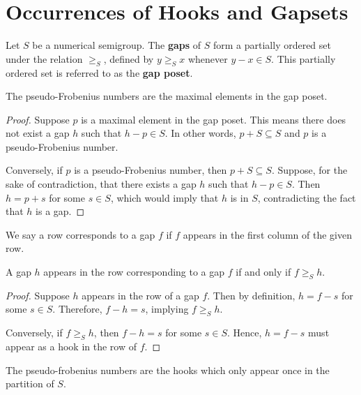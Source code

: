 \section{Occurrences of Hooks and Gapsets}

\begin{definition}
Let \( S \) be a numerical semigroup. The \textbf{gaps} of \( S \) form a partially ordered set under the relation \( \ge_S \), defined by \( y \ge_S x \) whenever \( y - x \in S \). This partially ordered set is referred to as the \textbf{gap poset}.
\end{definition}

\begin{proposition}
    The pseudo-Frobenius numbers are the maximal elements in the gap poset.
\end{proposition}

\begin{proof}
    Suppose \( p \) is a maximal element in the gap poset. This means there does not exist a gap \( h \) such that \( h - p \in S \). In other words, \( p + S \subseteq S \) and \( p \) is a pseudo-Frobenius number.

    Conversely, if \( p \) is a pseudo-Frobenius number, then \( p + S \subseteq S \). Suppose, for the sake of contradiction, that there exists a gap \( h \) such that \( h - p \in S \). Then \( h = p + s \) for some \( s \in S \), which would imply that \( h \) is in \( S \), contradicting the fact that \( h \) is a gap.
\end{proof}

We say a row corresponds to a gap \(f\) if \(f\) appears in the first column of the given row. 

\begin{proposition}
A gap \( h \) appears in the row corresponding to a gap \( f \) if and only if \( f \ge_S h \).
\end{proposition}

\begin{proof}
Suppose \( h \) appears in the row of a gap \( f \). Then by definition, \( h = f - s \) for some \( s \in S \). Therefore, \( f - h = s \), implying \( f \ge_S h \). 

Conversely, if \( f \ge_S h \), then \( f - h = s \) for some \( s \in S \). Hence, \( h = f - s \) must appear as a hook in the row of \( f \).
\end{proof}

\begin{corollary}
    The pseudo-frobenius numbers are the hooks which only appear once in the partition of \(S\).
\end{corollary}

